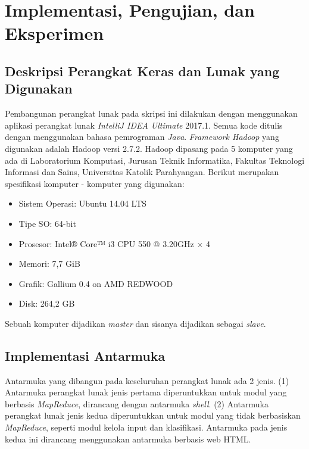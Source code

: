 \chapter{Implementasi, Pengujian, dan Eksperimen}
\label{chap:Implementasi, Pengujian, dan Eksperimen}

\section{Deskripsi Perangkat Keras dan Lunak yang Digunakan}
\label{sec:desc_perangkat}
Pembangunan perangkat lunak pada skripsi ini dilakukan dengan menggunakan aplikasi perangkat lunak \textit{IntelliJ IDEA Ultimate} 2017.1. Semua kode ditulis dengan menggunakan bahasa pemrograman \textit{Java}. \textit{Framework Hadoop} yang digunakan adalah Hadoop versi 2.7.2. Hadoop dipasang pada 5 komputer yang ada di Laboratorium Komputasi, Jurusan Teknik Informatika, Fakultas Teknologi Informasi dan Sains, Universitas Katolik Parahyangan. Berikut merupakan spesifikasi komputer - komputer yang digunakan:
\begin{itemize}
	\item Sistem Operasi: Ubuntu 14.04 LTS
	\item Tipe SO: 64-bit
	\item Prosesor: Intel® Core™ i3 CPU 550 @ 3.20GHz × 4 
	\item Memori: 7,7 GiB
	\item Grafik: Gallium 0.4 on AMD REDWOOD
	\item Disk: 264,2 GB
\end{itemize}
Sebuah komputer dijadikan \textit{master} dan sisanya dijadikan sebagai \textit{slave}.

\section{Implementasi Antarmuka}
\label{sec:impl_antarmuka}

Antarmuka yang dibangun pada keseluruhan perangkat lunak ada 2 jenis. (1) Antarmuka perangkat lunak jenis pertama diperuntukkan untuk modul yang berbasis \textit{MapReduce}, dirancang dengan antarmuka \textit{shell}. (2) Antarmuka perangkat lunak jenis kedua diperuntukkan untuk modul yang tidak berbasiskan \textit{MapReduce}, seperti modul kelola input dan klasifikasi. Antarmuka pada jenis kedua ini dirancang menggunakan antarmuka berbasis web HTML.

